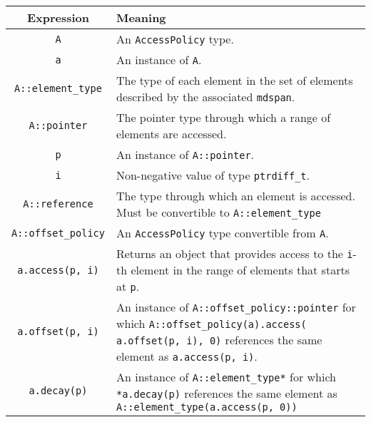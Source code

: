 \begin{tabular}{|c|p{15em}|}
\hline
Expression & Meaning \\
\hline
    \texttt{A} & An \texttt{AccessPolicy} type. \\
    \texttt{a} & An instance of \texttt{A}. \\
    \texttt{A::element\_type} & The type of each element in the set of elements described by the associated \texttt{mdspan}. \\
    \texttt{A::pointer} & The pointer type through which a range of elements are accessed. \\
    \texttt{p} & An instance of \texttt{A::pointer}. \\
    \texttt{i} & Non-negative value of type \texttt{ptrdiff\_t}. \\
    \texttt{A::reference} & The type through which an element is accessed.  Must be convertible to \texttt{A::element\_type} \\
    \texttt{A::offset\_policy} & An \texttt{AccessPolicy} type convertible from \texttt{A}. \\
    \texttt{a.access(p, i)} & Returns an object that provides access to the \texttt{i}-th element in the range of elements that starts at \texttt{p}. \\
    \texttt{a.offset(p, i)} & An instance of \texttt{A::offset\_policy::pointer} for which \texttt{A::offset\_policy(a).access( a.offset(p, i), 0)} references the same element as \texttt{a.access(p, i)}. \\
    \texttt{a.decay(p)} & An instance of \texttt{A::element\_type*} for which \texttt{*a.decay(p)} references the same element as \texttt{A::element\_type(a.access(p, 0))} \\
\hline
\end{tabular}
